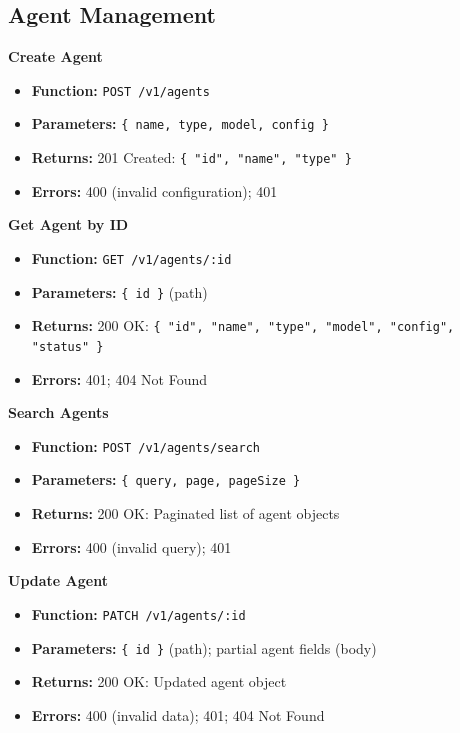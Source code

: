 \documentclass[a4paper]{article}
\begin{document}
\subsection{Agent Management}

\textbf{Create Agent}
\begin{itemize}
  \item \textbf{Function:} \texttt{POST /v1/agents}
  \item \textbf{Parameters:} \texttt{\{ name, type, model, config \}}
  \item \textbf{Returns:} 201 Created: \texttt{\{ "id", "name", "type" \}}
  \item \textbf{Errors:} 400 (invalid configuration); 401
\end{itemize}

\textbf{Get Agent by ID}
\begin{itemize}
  \item \textbf{Function:} \texttt{GET /v1/agents/:id}
  \item \textbf{Parameters:} \texttt{\{ id \}} (path)
  \item \textbf{Returns:} 200 OK: \texttt{\{ "id", "name", "type", "model", "config", "status" \}}
  \item \textbf{Errors:} 401; 404 Not Found
\end{itemize}

\textbf{Search Agents}
\begin{itemize}
  \item \textbf{Function:} \texttt{POST /v1/agents/search}
  \item \textbf{Parameters:} \texttt{\{ query, page, pageSize \}}
  \item \textbf{Returns:} 200 OK: Paginated list of agent objects
  \item \textbf{Errors:} 400 (invalid query); 401
\end{itemize}

\textbf{Update Agent}
\begin{itemize}
  \item \textbf{Function:} \texttt{PATCH /v1/agents/:id}
  \item \textbf{Parameters:} \texttt{\{ id \}} (path); partial agent fields (body)
  \item \textbf{Returns:} 200 OK: Updated agent object
  \item \textbf{Errors:} 400 (invalid data); 401; 404 Not Found
\end{itemize}
\end{document}

